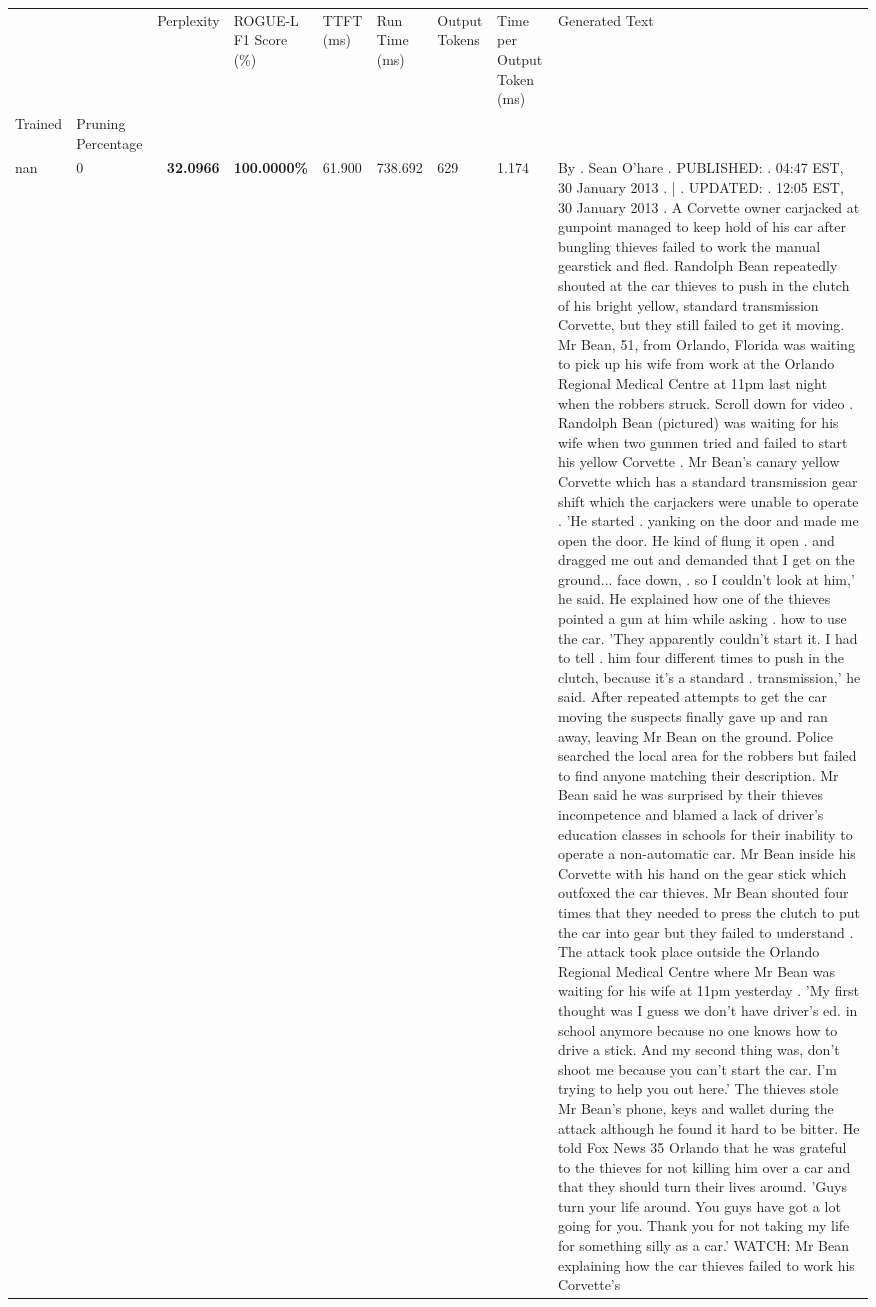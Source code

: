 \begin{table}[H]
\label{tab:evaluation-pipeline-1}
\begin{tabular}{|m{}| m{}| r | R{0.13\textwidth}| R{0.09\textwidth}| R{0.09\textwidth}| R{0.09\textwidth}| R{0.11\textwidth}|}
\toprule
 &  & Perplexity & ROGUE-L F1 Score (\%) & TTFT (ms) & Run Time (ms) & Output Tokens & Time per Output Token (ms) & Generated Text \\
Trained & Pruning Percentage &  &  &  &  &  &  &  \\
\midrule
nan & 0 & \bfseries 32.0966 & \bfseries 100.0000\% & 61.900 & 738.692 & 629 & 1.174 & By . Sean O'hare . PUBLISHED: . 04:47 EST, 30 January 2013 . | . UPDATED: . 12:05 EST, 30 January 2013 . A Corvette owner carjacked at gunpoint managed to keep hold of his car after bungling thieves failed to work the manual gearstick and fled. Randolph Bean repeatedly shouted at the car thieves to push in the clutch of his bright yellow, standard transmission Corvette, but they still failed to get it moving. Mr Bean, 51, from Orlando, Florida was waiting to pick up his wife from work at the Orlando Regional Medical Centre at 11pm last night when the robbers struck. Scroll down for video . Randolph Bean (pictured) was waiting for his wife when two gunmen tried and failed to start his yellow Corvette . Mr Bean's canary yellow Corvette which has a standard transmission gear shift which the carjackers were unable to operate . 'He started . yanking on the door and made me open the door. He kind of flung it open . and dragged me out and demanded that I get on the ground... face down, . so I couldn't look at him,' he said. He explained how one of the thieves pointed a gun at him while asking . how to use the car. 'They apparently couldn't start it. I had to tell . him four different times to push in the clutch, because it's a standard . transmission,' he said. After repeated attempts to get the car moving the suspects finally gave up and ran away, leaving Mr Bean on the ground. Police searched the local area for the robbers but failed to find anyone matching their description. Mr Bean said he was surprised by their thieves incompetence and blamed a lack of driver's education classes in schools for their inability to operate a non-automatic car. Mr Bean inside his Corvette with his hand on the gear stick which outfoxed the car thieves. Mr Bean shouted four times that they needed to press the clutch to put the car into gear but they failed to understand . The attack took place outside the Orlando Regional Medical Centre where Mr Bean was waiting for his wife at 11pm yesterday . 'My first thought was I guess we don't have driver's ed. in school anymore because no one knows how to drive a stick. And my second thing was, don't shoot me because you can't start the car. I'm trying to help you out here.' The thieves stole Mr Bean's phone, keys and wallet during the attack although he found it hard to be bitter. He told Fox News 35 Orlando that he was grateful to the thieves for not killing him over a car and that they should turn their lives around. 'Guys turn your life around. You guys have got a lot going for you. Thank you for not taking my life for something silly as a car.' WATCH: Mr Bean explaining how the car thieves failed to work his Corvette's 
\end{tabular}
\end{table}
